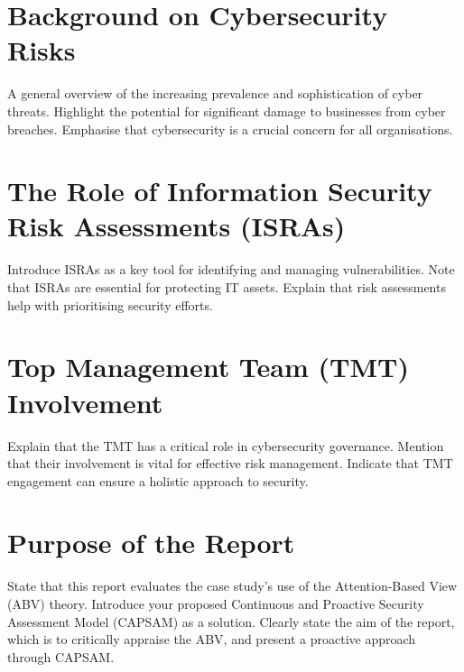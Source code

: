 \section{Background on Cybersecurity Risks}
A general overview of the increasing prevalence and sophistication of cyber threats. Highlight the potential for significant damage to businesses from cyber breaches. Emphasise that cybersecurity is a crucial concern for all organisations.

\section{The Role of Information Security Risk Assessments (ISRAs)}
Introduce ISRAs as a key tool for identifying and managing vulnerabilities. Note that ISRAs are essential for protecting IT assets. Explain that risk assessments help with prioritising security efforts.

\section{Top Management Team (TMT) Involvement}
Explain that the TMT has a critical role in cybersecurity governance. Mention that their involvement is vital for effective risk management. Indicate that TMT engagement can ensure a holistic approach to security.

\section{Purpose of the Report}
State that this report evaluates the case study's use of the Attention-Based View (ABV) theory. Introduce your proposed Continuous and Proactive Security Assessment Model (CAPSAM) as a solution. Clearly state the aim of the report, which is to critically appraise the ABV, and present a proactive approach through CAPSAM.